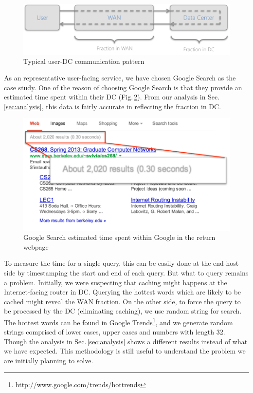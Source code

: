 \begin{figure}
  \centering
  \includegraphics[width=\linewidth]{../figs/DC_model.pdf}
  \caption{Typical user-DC communication pattern}
  \label{fig:DC_model}
\end{figure}

As an representative user-facing service, we have chosen Google Search as the case study. One of the reason of choosing Google Search is that they provide an estimated time spent within their DC (Fig.\,\ref{fig:google_time}). From our analysis in Sec.\,\ref{sec:analysis}, this data is fairly accurate in reflecting the fraction in DC. 

\begin{figure}
  \centering
  \includegraphics[width=0.85\linewidth]{../figs/GoogleTime.pdf}
  \caption{Google Search estimated time spent within Google in the return webpage}
  \label{fig:google_time}
\end{figure}

To measure the time for a single query, this can be easily done at the end-host side by timestamping the start and end of each query. But what to query remains a problem. Initially, we were suspecting that caching might happens at the Internet-facing router in DC. Querying the hottest words which are likely to be cached might reveal the WAN fraction. On the other side, to force the query to be processed by the DC (eliminating caching), we use random string for search. The hottest words can be found in Google Trends\footnote{http://www.google.com/trends/hottrends}, and we generate random strings comprised of lower cases, upper cases and numbers with length 32. Though the analysis in Sec.\,\ref{sec:analysis} shows a different results instead of what we have expected. This methodology is still useful to understand the problem we are initially planning to solve. 

